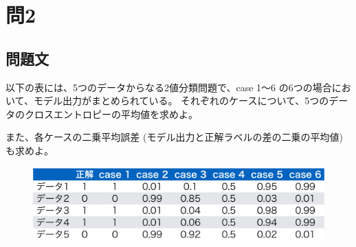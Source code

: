 \documentclass{article}[jsarticle]
\begin{document}
\section{問2}
\subsection{問題文}
以下の表には、5つのデータからなる2値分類問題で、case 1～6 の6つの場合において、モデル出力がまとめられている。
それぞれのケースについて、5つのデータのクロスエントロピーの平均値を求めよ。\par 
また、各ケースの二乗平均誤差 (モデル出力と正解ラベルの差の二乗の平均値) も求めよ。
\begin{figure}[H]
    \centering
    \includegraphics[scale=0.3]{./2023-06-23215207.png}
\end{figure}
\end{document}
